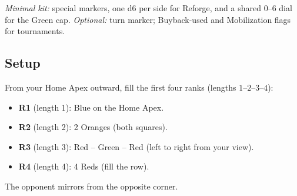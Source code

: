 \documentclass[11pt]{article}
\begin{document}
\smallskip
\noindent\textit{Minimal kit:} special markers, one d6 per side for Reforge, and a shared 0--6 dial for the Green cap. \textit{Optional:} turn marker; Buyback-used and Mobilization flags for tournaments.

\subsection*{Setup}
From your Home Apex outward, fill the first four ranks (lengths \(1\text{--}2\text{--}3\text{--}4\)):
\begin{itemize}[leftmargin=1.3em,itemsep=0.2em]
  \item \textbf{R1} (length 1): Blue on the Home Apex.
  \item \textbf{R2} (length 2): 2 Oranges (both squares).
  \item \textbf{R3} (length 3): Red -- Green -- Red (left to right from your view).
  \item \textbf{R4} (length 4): 4 Reds (fill the row).
\end{itemize}
The opponent mirrors from the opposite corner.
\end{document}
